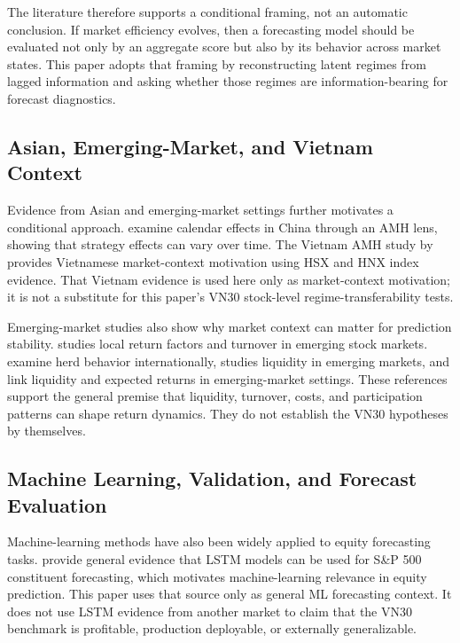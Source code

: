 \documentclass[12pt,a4paper]{article}
\begin{document}
The literature therefore supports a conditional framing, not an automatic conclusion. If market efficiency evolves, then a forecasting model should be evaluated not only by an aggregate score but also by its behavior across market states. This paper adopts that framing by reconstructing latent regimes from lagged information and asking whether those regimes are information-bearing for forecast diagnostics.

\subsection{Asian, Emerging-Market, and Vietnam Context}

Evidence from Asian and emerging-market settings further motivates a conditional approach. \citet{XiongMengLiShen2019} examine calendar effects in China through an AMH lens, showing that strategy effects can vary over time. The Vietnam AMH study by \citet{DzungPhanTranTrungPhamQuang2019} provides Vietnamese market-context motivation using HSX and HNX index evidence. That Vietnam evidence is used here only as market-context motivation; it is not a substitute for this paper's VN30 stock-level regime-transferability tests.

Emerging-market studies also show why market context can matter for prediction stability. \citet{Rouwenhorst1999} studies local return factors and turnover in emerging stock markets. \citet{ChangChengKhorana2000} examine herd behavior internationally, \citet{Lesmond2005} studies liquidity in emerging markets, and \citet{BekaertHarveyLundblad2007} link liquidity and expected returns in emerging-market settings. These references support the general premise that liquidity, turnover, costs, and participation patterns can shape return dynamics. They do not establish the VN30 hypotheses by themselves.

\subsection{Machine Learning, Validation, and Forecast Evaluation}

Machine-learning methods have also been widely applied to equity forecasting tasks. \citet{FischerKrauss2018} provide general evidence that LSTM models can be used for S\&P 500 constituent forecasting, which motivates machine-learning relevance in equity prediction. This paper uses that source only as general ML forecasting context. It does not use LSTM evidence from another market to claim that the VN30 benchmark is profitable, production deployable, or externally generalizable.
\end{document}
